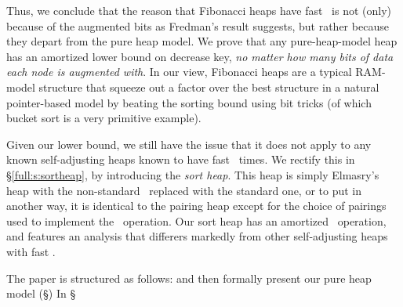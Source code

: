 Thus, we conclude that the reason that Fibonacci heaps have fast \opDc\ is not (only) because of the augmented bits as Fredman's result suggests, but rather because they depart from the pure heap model. We prove that any pure-heap-model heap has an  amortized lower bound on decrease key, \emph{no matter how many bits of data each node is augmented with}. 
In our view, Fibonacci heaps are a typical RAM-model structure that squeeze out a  factor over the best structure in a natural pointer-based model by beating the sorting bound using bit tricks (of which bucket sort is a very primitive example).


Given our lower bound, we still have the issue that it does not apply to any known self-adjusting heaps known to have fast \opDc\ times. We rectify this in \S\ref{full:s:sortheap}, by introducing the \emph{sort heap}. This heap is simply Elmasry's heap with the non-standard \opDc\ replaced with the standard one, or to put in another way, it is identical to the pairing heap except for the choice of pairings used to implement the \opEm\ operation. Our sort heap has an  amortized \opDc\ operation, and features an analysis that differers markedly from other self-adjusting heaps with fast \opDc.

The paper is structured as follows: 
and then formally present our pure heap model (\S{})
In \S{} 



